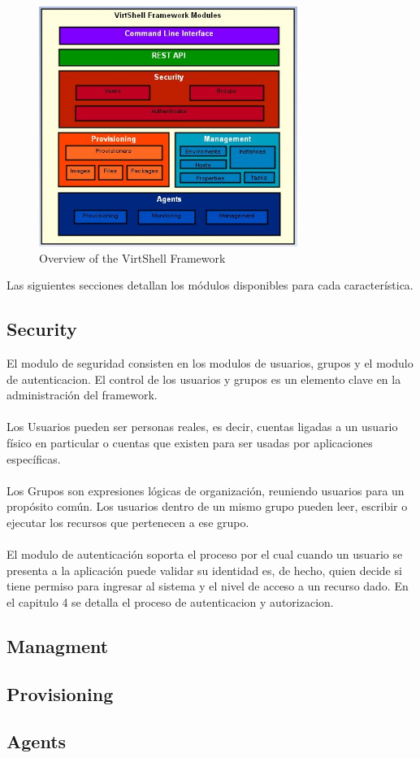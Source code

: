 \begin{figure}
	\caption{Overview of the VirtShell Framework}
	\includegraphics[width = 0.75\textwidth]{figures/framework}
\end{figure}

Las siguientes secciones detallan los módulos disponibles para cada característica. 

\subsection{Security}
El modulo de seguridad consisten en los modulos de usuarios, grupos y el modulo de autenticacion. El control de los usuarios y grupos es un elemento clave en la administración del framework.\\
\\
Los Usuarios pueden ser personas reales, es decir, cuentas ligadas a un usuario físico en particular o cuentas que existen para ser usadas por aplicaciones específicas.\\
\\
Los Grupos son expresiones lógicas de organización, reuniendo usuarios para un propósito común. Los usuarios dentro de un mismo grupo pueden leer, escribir o ejecutar los recursos que pertenecen a ese grupo.\\
\\
El modulo de autenticación soporta el proceso por el cual cuando un usuario se presenta a la aplicación puede validar su identidad es, de hecho, quien decide si tiene permiso para ingresar al sistema y el nivel de acceso a un recurso dado. En el capitulo 4 se detalla el proceso de autenticacion y autorizacion.

\subsection{Managment}



\subsection{Provisioning}

\subsection{Agents}


